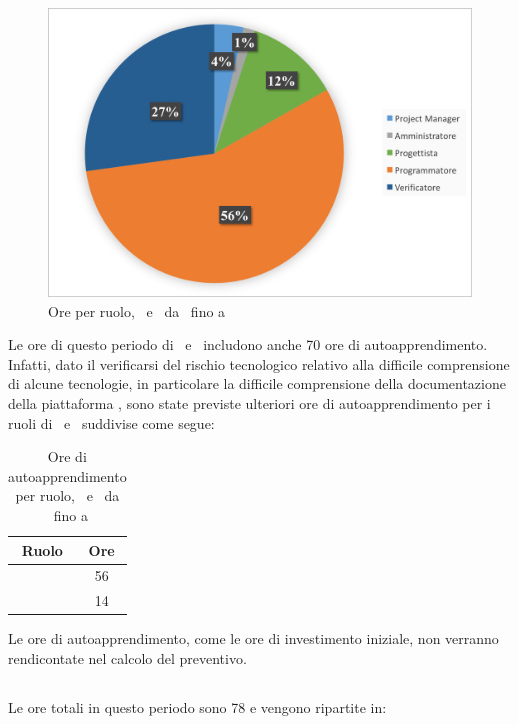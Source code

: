 \begin{figure}[H]
	\centering 
	\includegraphics[scale=0.7]{Immagini/GraficiTorte/COD.png}
	\caption{Ore per ruolo, \PD\ e \COD\ da \RP\ fino a \RQ}
\end{figure}

Le ore di questo periodo di \PD\ e \COD\ includono anche 70 ore di autoapprendimento. Infatti, dato il verificarsi del rischio tecnologico relativo alla difficile comprensione di alcune tecnologie, in particolare la difficile comprensione della documentazione della piattaforma , sono state previste ulteriori ore di autoapprendimento per i ruoli di \Progr\ e \Ver\ suddivise come segue:

\begin{table}[h]
	\begin{center}
		\begin{tabular}{|c|c|}
			\hline
			\textbf{Ruolo}	& \textbf{Ore} \\
			\hline
			\Progr	&	56\\
			\hline
			\Ver	&	14\\
			\hline
		\end{tabular}
	\end{center}
	\caption{Ore di autoapprendimento per ruolo, \PD\ e \COD\ da \RP\ fino a \RQ}
\end{table}

Le ore di autoapprendimento, come le ore di investimento iniziale, non verranno rendicontate nel calcolo del preventivo.

\newpage
\subsection{\VV}
Le ore totali in questo periodo sono 78 e vengono ripartite in:

